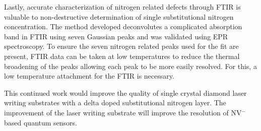 Lastly, accurate characterization of nitrogen related defects through FTIR is valuable to non-destructive determination of single substitutional nitrogen concentration. The method developed deconvolutes a complicated absorption band in FTIR using seven Gaussian peaks and was validated using EPR spectroscopy. To ensure the seven nitrogen related peaks used for the fit are present, FTIR data can be taken at low temperatures to reduce the thermal broadening of the peaks allowing each peak to be more easily resolved. For this, a low temperature attachment for the FTIR is necessary.

This continued work would improve the quality of single crystal diamond laser writing substrates with a delta doped substitutional nitrogen layer. The improvement of the laser writing substrate will improve the resolution of NV$^-$ based quantum sensors.